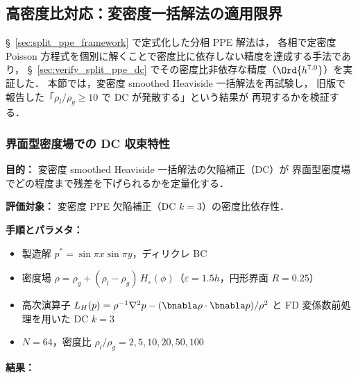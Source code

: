 %
\subsection{高密度比対応：変密度一括解法の適用限界}
\label{sec:interface_crossing}

§~\ref{sec:split_ppe_framework} で定式化した分相 PPE 解法は，
各相で定密度 Poisson 方程式を個別に解くことで密度比に依存しない精度を達成する手法であり，
§~\ref{sec:verify_split_ppe_dc} でその密度比非依存な精度（$\Ord{h^{7.0}}$）を実証した．
本節では，変密度 smoothed Heaviside 一括解法を再試験し，
旧版で報告した「$\rho_l/\rho_g \geq 10$ で DC が発散する」という結果が
再現するかを検証する．

\subsubsection{界面型密度場での DC 収束特性}
\label{sec:varrho_dc_convergence}

\noindent\textbf{目的：}
変密度 smoothed Heaviside 一括解法の欠陥補正（DC）が
界面型密度場でどの程度まで残差を下げられるかを定量化する．

\noindent\textbf{評価対象：}
変密度 PPE 欠陥補正（DC $k = 3$）の密度比依存性．

\noindent\textbf{手順とパラメタ：}
\begin{itemize}[noitemsep]
  \item 製造解 $p^* = \sin\pi x\sin\pi y$，ディリクレ BC
  \item 密度場 $\rho = \rho_g + (\rho_l - \rho_g)\,H_\varepsilon(\phi)$（$\varepsilon = 1.5h$，円形界面 $R = 0.25$）
  \item 高次演算子
        $L_H(p) = \rho^{-1}\nabla^2 p - (\bnabla\rho\cdot\bnabla p)/\rho^2$
        と FD 変係数前処理を用いた DC $k = 3$
  \item $N = 64$，密度比 $\rho_l/\rho_g = 2, 5, 10, 20, 50, 100$
\end{itemize}

\noindent\textbf{結果：}

